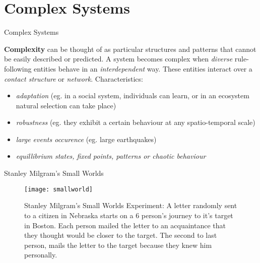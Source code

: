 \section{Complex Systems}

{
\begin{frame}{Complex Systems}


{\bf Complexity} can be thought of as particular structures and patterns that cannot be easily described or predicted. A system becomes complex when {\it diverse} rule-following entities behave in an {\it interdependent} way. These entities interact over a {\it contact structure} or {\it network}. Characteristics:
\begin{itemize}
	\item {\it adaptation} (eg. in a social system, individuals can learn, or in an ecosystem natural selection can take place)
	\item {\it robustness} (eg. they exhibit a certain behaviour at any spatio-temporal scale)
	\item {\it large events occurence} (eg. large earthquakes)
	\item {\it equillibrium states, fixed points, patterns or chaotic behaviour}
\end{itemize}

\end{frame}
}


\begin{frame}{Stanley Milgram's Small Worlds}
\begin{figure}[!h]
  \centering
  \texttt{[image: smallworld]}
  \caption{Stanley Milgram's Small Worlds Experiment: A letter randomly sent to a citizen in Nebraska starts on a 6 person's journey to it's target in Boston. Each person mailed the letter to an acquaintance that they thought would be closer to the target. The second to last person, mails the letter to the target because they knew him personally.}
  \label{fig:smallWorld}
\end{figure}
\end{frame}


